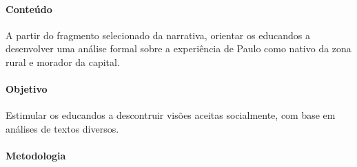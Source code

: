 \documentclass{extarticle}
\begin{document}
\paragraph{Conteúdo}
A partir do fragmento selecionado da narrativa, orientar os educandos
a desenvolver uma análise formal sobre a experiência de Paulo como
nativo da zona rural e morador da capital.

\paragraph{Objetivo}
Estimular os educandos a descontruir visões aceitas socialmente, com
base em análises de textos diversos.

\paragraph{Metodologia}
\end{document}
